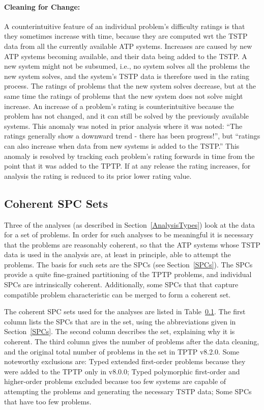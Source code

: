 \documentclass[runningheads]{llncs}
\begin{document}
\paragraph{Cleaning for Change:}
A counterintuitive feature of an individual problem's difficulty ratings is that they sometimes 
increase with time, because they are computed wrt the TSTP data from all the currently available
ATP systems.
Increases are caused by new ATP systems becoming available, and their data being added to the TSTP.
A new system might not be subsumed, i.e., no system solves all the problems the new system solves, 
and the system's TSTP data is therefore used in the rating process.
The ratings of problems that the new system solves decrease, but at the same time the ratings of
problems that the new system does not solve might increase.
An increase of a problem's rating is counterintuitive because the problem has not changed, and 
it can still be solved by the previously available systems.
This anomaly was noted in prior analysis \cite{Sut17} where it was noted: ``The ratings generally 
show a downward trend - there has been progress!'', but ``ratings can also increase when data 
from new systems is added to the TSTP.''
This anomaly is resolved by tracking each problem's rating forwards in time from the point 
that it was added to the TPTP.
If at any release the rating increases, for analysis the rating is reduced to its prior
lower rating value.

\subsection{Coherent SPC Sets}
\label{SPCSets}

Three of the analyses (as described in Section~\ref{AnalysisTypes}) look at the data for a set
of problems.
In order for such analyses to be meaningful it is necessary that the problems are reasonably
coherent, so that the ATP systems whose TSTP data is used in the analysis are, at least
in principle, able to attempt the problems.
The basis for such sets are the SPCs (see Section~\ref{SPCs}).
The SPCs provide a quite fine-grained partitioning of the TPTP problems, and individual SPCs
are intrinsically coherent.
Additionally, some SPCs that that capture compatible problem characteristic can be merged
to form a coherent set.

The coherent SPC sets used for the analyses are listed in Table~\ref{SPCSets}.
The first column lists the SPCs that are in the set, using the abbreviations given in 
Section~\ref{SPCs}.
The second column describes the set, explaining why it is coherent.
The third column gives the number of problems after the data cleaning, and the original
total number of problems in the set in TPTP v8.2.0.
Some noteworthy exclusions are:
Typed extended first-order problems because they were added to the TPTP only in v8.0.0;
Typed polymorphic first-order and higher-order problems excluded because too few systems are 
capable of attempting the problems and generating the necessary TSTP data;
Some SPCs that have too few problems.
\end{document}

